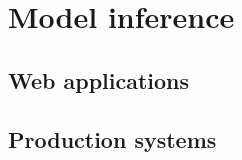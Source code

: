 %
\chapter{Model inference}
\label{sec:modelinf}

\section{Web applications}
\label{sec:modelinf}

\section{Production systems}
\label{sec:modelinf}
